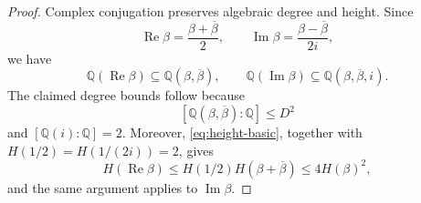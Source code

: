 \documentclass[10pt,a4paper]{amsart}
\DeclareMathOperator{\ImPart}{Im}
\newcommand{\Q}{\mathbb{Q}}
\DeclareMathOperator{\RePart}{Re}
\begin{document}
\begin{proof}
Complex conjugation preserves algebraic degree and height. Since
\[
\RePart\beta=\frac{\beta+\overline\beta}{2},
\qquad
\ImPart\beta=\frac{\beta-\overline\beta}{2i},
\]
we have
\[
\Q(\RePart\beta)\subseteq\Q(\beta,\overline\beta),
\qquad
\Q(\ImPart\beta)\subseteq\Q(\beta,\overline\beta,i).
\]
The claimed degree bounds follow because
\[
[\Q(\beta,\overline\beta):\Q]\leq D^2
\]
and $[\Q(i):\Q]=2$. Moreover, \eqref{eq:height-basic}, together with $H(1/2)=H(1/(2i))=2$, gives
\[
H(\RePart\beta)
\leq H(1/2)H(\beta+\overline\beta)
\leq4H(\beta)^2,
\]
and the same argument applies to $\ImPart\beta$.
\end{proof}
\end{document}
